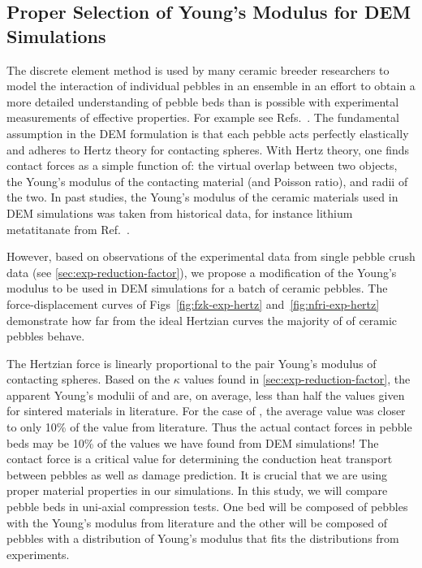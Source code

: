 \subsection{Proper Selection of Young's Modulus for DEM Simulations}\label{sec:dem-studies-youngs-modulus}

The discrete element method is used by many ceramic breeder researchers to model the interaction of individual pebbles in an ensemble in an effort to obtain a more detailed understanding of pebble beds than is possible with experimental measurements of effective properties. For example see Refs.~\cite{An20071393, Lu2000, Zhao2010, Gan:2010uq, Annabattula2012a, VanLew2014}. The fundamental assumption in the DEM formulation is that each pebble acts perfectly elastically and adheres to Hertz theory for contacting spheres. With Hertz theory, one finds contact forces as a simple function of: the virtual overlap between two objects, the Young's modulus of the contacting material (and Poisson ratio), and radii of the two. In past studies, the Young's modulus of the ceramic materials  used in DEM simulations was taken from historical data, for instance lithium metatitanate from Ref.~\cite{Gierszewski1998}.

However, based on observations of the experimental data from single pebble crush data (see \cref{sec:exp-reduction-factor}), we propose a modification of the Young's modulus to be used in DEM simulations for a batch of ceramic pebbles. The force-displacement curves of Figs~\ref{fig:fzk-exp-hertz} and~\ref{fig:nfri-exp-hertz} demonstrate how far from the ideal Hertzian curves the majority of of ceramic pebbles behave.

The Hertzian force is linearly proportional to the pair Young's modulus of contacting spheres. Based on the $\kappa$ values found in \cref{sec:exp-reduction-factor}, the apparent Young's modulii of \lis and \lit are, on average, less than half the values given for sintered materials in literature. For the case of \lit, the average value was closer to only 10\% of the value from literature. Thus the actual contact forces in pebble beds may be 10\% of the values we have found from DEM simulations! The contact force is a critical value for determining the conduction heat transport between pebbles as well as damage prediction. It is crucial that we are using proper material properties in our simulations. In this study, we will compare pebble beds in uni-axial compression tests. One bed will be composed of pebbles with the Young's modulus from literature and the other will be composed of pebbles with a distribution of Young's modulus that fits the distributions from experiments.



